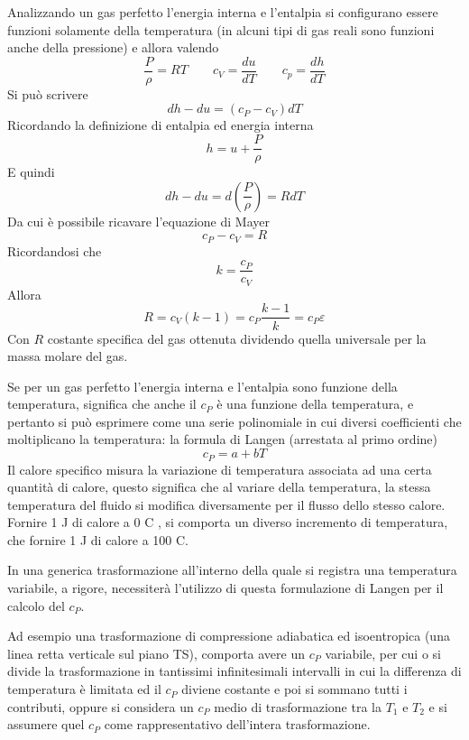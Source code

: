 \begin{adjustwidth}{2in}{}
	Analizzando un gas perfetto l'energia interna e l'entalpia si configurano essere funzioni solamente della temperatura (in alcuni tipi di gas reali sono funzioni anche della pressione) e allora valendo
	\[\dfrac{P}{\rho} = RT \qquad c_V = \dfrac{du}{dT} \qquad c_p = \dfrac{dh}{dT} \] 
	Si può scrivere 
	\[dh -du = (c_P-c_V)dT\]
	Ricordando la definizione di entalpia ed energia interna
	\[h =  u + \dfrac{P}{\rho}\]
	E quindi 
	\[dh - du = d\left(\dfrac{P}{\rho}\right) = RdT\]
	Da cui è possibile ricavare l'equazione di Mayer
	\begin{equation}\label{eq:1.14}
		\boxed{c_P-c_V = R}
	\end{equation}
	Ricordandosi che
	\[k = \dfrac{c_P}{c_V}\]
	Allora 
	\begin{equation}\label{eq:1.15}
		\boxed{R = c_V(k-1) = c_P\dfrac{k-1}{k} = c_P\varepsilon}
	\end{equation}
	Con $R$ costante specifica del gas ottenuta dividendo quella universale per la massa molare del gas. \newline
	
	Se per un gas perfetto l'energia interna e l'entalpia sono funzione della temperatura, significa che anche il $c_P$ è una funzione della temperatura, e pertanto si può esprimere come una serie polinomiale in cui diversi coefficienti che moltiplicano la temperatura: la formula di Langen (arrestata al primo ordine)	 	  
\begin{equation}\label{eq:1.16}
		\boxed{c_P = a + bT}
\end{equation}
	Il calore specifico misura la variazione di temperatura associata ad una certa quantità di calore, questo significa che al variare della temperatura, la stessa temperatura del fluido si modifica diversamente per il flusso dello stesso calore. Fornire 1 J di calore a 0 \degree C , si comporta un diverso incremento di temperatura, che fornire 1 J di calore a 100 \degree C. 
	
	In una generica trasformazione all'interno della quale si registra una temperatura variabile, a rigore, necessiterà l'utilizzo di questa formulazione di Langen per il calcolo del $c_P$.
	
	Ad esempio una trasformazione di compressione adiabatica ed isoentropica (una linea retta verticale sul piano TS), comporta avere un $c_P$ variabile, per cui o si divide la trasformazione in tantissimi infinitesimali intervalli in cui la differenza di temperatura è limitata ed il $c_P$ diviene costante e poi si sommano tutti i contributi, oppure si considera un $c_P$ medio di trasformazione tra la $T_1$ e $T_2$ e si assumere quel $c_P$ come rappresentativo dell'intera trasformazione. 
	

\end{adjustwidth}
